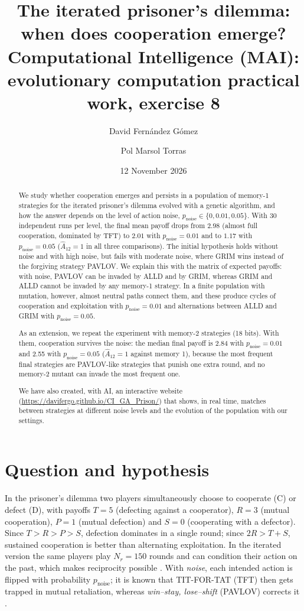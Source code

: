 \documentclass[10pt,a4paper]{article}
\title{\textbf{The iterated prisoner's dilemma:\\ when does cooperation emerge?}\\[4pt]
\large Computational Intelligence (MAI): evolutionary computation practical work, exercise 8}
\author{David Fernández Gómez \and Pol Marsol Torras}
\date{12 November 2026}
\newcommand{\pn}{p_{\text{noise}}}
\newcommand{\Atwelve}{\hat{A}_{12}}
\begin{document}
\maketitle

\begin{abstract}
\noindent We study whether cooperation emerges and persists in a population of memory-1 strategies for the
iterated prisoner's dilemma evolved with a genetic algorithm, and how the answer depends on the level of
action noise, $\pn \in \{0, 0.01, 0.05\}$. With 30 independent runs per level, the final mean payoff drops
from $2.98$ (almost full cooperation, dominated by TFT) to $2.01$ with $\pn=0.01$ and to $1.17$ with
$\pn=0.05$ ($\Atwelve=1$ in all three comparisons). The initial hypothesis holds without noise and with
high noise, but fails with moderate noise, where GRIM wins instead of the forgiving strategy PAVLOV.
We explain this with the matrix of expected payoffs: with noise, PAVLOV can be invaded by ALLD and by GRIM,
whereas GRIM and ALLD cannot be invaded by any memory-1 strategy. In a finite population with mutation,
however, almost neutral paths connect them, and these produce cycles of cooperation and exploitation with
$\pn=0.01$ and alternations between ALLD and GRIM with $\pn=0.05$.

\noindent As an extension, we repeat the experiment with memory-2 strategies (18 bits). With them,
cooperation survives the noise: the median final payoff is 2.84 with $\pn=0.01$ and 2.55 with $\pn=0.05$
($\Atwelve=1$ against memory 1), because the most frequent final strategies are PAVLOV-like strategies that
punish one extra round, and no memory-2 mutant can invade the most frequent one.

\noindent We have also created, with AI, an interactive website (\url{https://davifergo.github.io/CI_GA_Prison/})
that shows, in real time, matches between strategies at different noise levels and the evolution of the
population with our settings.
\end{abstract}

\section{Question and hypothesis}
In the prisoner's dilemma two players simultaneously choose to cooperate (C) or defect (D), with payoffs
$T=5$ (defecting against a cooperator), $R=3$ (mutual cooperation), $P=1$ (mutual defection) and $S=0$
(cooperating with a defector). Since $T>R>P>S$, defection dominates in a single round; since $2R>T+S$,
sustained cooperation is better than alternating exploitation. In the iterated version the same players
play $N_r=150$ rounds and can condition their action on the past, which makes reciprocity possible
\cite{axelrod1987}. With \emph{noise}, each intended action is flipped with probability $\pn$; it is known
that TIT-FOR-TAT (TFT) then gets trapped in mutual retaliation, whereas \emph{win--stay, lose--shift}
(PAVLOV) corrects it \cite{nowak1993,wu1995}.
\end{document}
